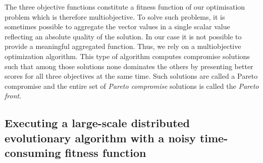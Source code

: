 The three objective functions constitute a fitness function of our optimisation problem which is therefore multiobjective. To solve such problems, it is sometimes possible to aggregate the vector values in a single scalar value reflecting an absolute quality of the solution. In our case it is not possible to provide a meaningful aggregated function. Thus, we rely on a multiobjective optimization algorithm. This type of algorithm computes compromise solutions such that among those solutions none dominates the others by presenting better scores for all three objectives at the same time. Such solutions are called a Pareto compromise and the entire set of \textit{Pareto compromise} solutions is called the \textit{Pareto front}.


\subsection{Executing a large-scale distributed evolutionary algorithm with a noisy time-consuming fitness function}
\label{subsec:executing}

